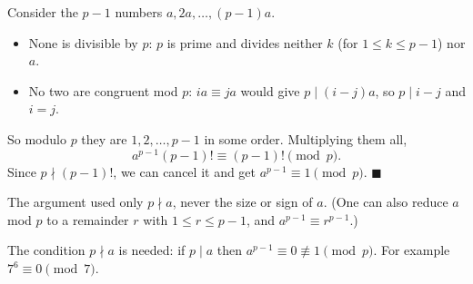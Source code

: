 Consider the $p-1$ numbers $a,2a,\dots,(p-1)a$.
\begin{itemize}
\item None is divisible by $p$: $p$ is prime and divides neither $k$ (for $1\le k\le p-1$) nor $a$.
\item No two are congruent mod $p$: $ia\equiv ja$ would give $p\mid(i-j)a$, so $p\mid i-j$ and $i=j$.
\end{itemize}
So modulo $p$ they are $1,2,\dots,p-1$ in some order. Multiplying them all,
\[a^{p-1}(p-1)!\equiv(p-1)!\pmod p.\]
Since $p\nmid(p-1)!$, we can cancel it and get $a^{p-1}\equiv1\pmod p$. $\blacksquare$

The argument used only $p\nmid a$, never the size or sign of $a$. (One can also reduce $a$ mod $p$ to a remainder $r$ with $1\le r\le p-1$, and $a^{p-1}\equiv r^{p-1}$.)

The condition $p\nmid a$ is needed: if $p\mid a$ then $a^{p-1}\equiv0\not\equiv1\pmod p$. For example $7^6\equiv0\pmod7$.
